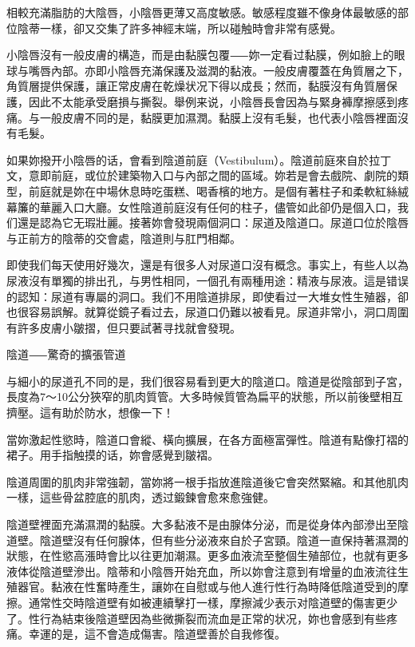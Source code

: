 \documentclass[12pt,UTF8]{ctexbook}
\begin{document}
相較充滿脂肪的大陰唇，小陰唇更薄又高度敏感。敏感程度雖不像身体最敏感的部位陰蒂一樣，卻又交集了許多神經末端，所以碰触時會非常有感覺。

小陰唇沒有一般皮膚的構造，而是由黏膜包覆⸺妳一定看过黏膜，例如臉上的眼球与嘴唇內部。亦即小陰唇充滿保護及滋潤的黏液。一般皮膚覆蓋在角質層之下，角質層提供保護，讓正常皮膚在乾燥状况下得以成長；然而，黏膜沒有角質層保護，因此不太能承受磨損与撕裂。舉例来说，小陰唇長會因為与緊身褲摩擦感到疼痛。与一般皮膚不同的是，黏膜更加濕潤。黏膜上沒有毛髮，也代表小陰唇裡面沒有毛髮。

如果妳撥开小陰唇的话，會看到陰道前庭（Vestibulum）。陰道前庭來自於拉丁文，意即前庭，或位於建築物入口与內部之間的區域。妳若是會去戲院、劇院的類型，前庭就是妳在中場休息時吃蛋糕、喝香檳的地方。是個有著柱子和柔軟紅絲絨幕簾的華麗入口大廳。女性陰道前庭沒有任何的柱子，儘管如此卻仍是個入口，我们還是認為它无瑕壯麗。接著妳會發現兩個洞口：尿道及陰道口。尿道口位於陰唇与正前方的陰蒂的交會處，陰道則与肛門相鄰。

即使我们每天使用好幾次，還是有很多人对尿道口沒有概念。事实上，有些人以為尿液沒有單獨的排出孔，与男性相同，一個孔有兩種用途：精液与尿液。這是错误的認知：尿道有專屬的洞口。我们不用陰道排尿，即使看过一大堆女性生殖器，卻也很容易誤解。就算從鏡子看过去，尿道口仍難以被看見。尿道非常小，洞口周圍有許多皮膚小皺摺，但只要試著寻找就會發現。





陰道⸺驚奇的擴張管道




与細小的尿道孔不同的是，我们很容易看到更大的陰道口。陰道是從陰部到子宮，長度為7〜10公分狹窄的肌肉質管。大多時候質管為扁平的狀態，所以前後壁相互擠壓。這有助於防水，想像一下！

當妳激起性慾時，陰道口會縱、橫向擴展，在各方面極富彈性。陰道有點像打褶的裙子。用手指触摸的话，妳會感覺到皺褶。

陰道周圍的肌肉非常強韌，當妳將一根手指放進陰道後它會突然緊縮。和其他肌肉一樣，這些骨盆腔底的肌肉，透过鍛鍊會愈來愈強健。

陰道壁裡面充滿濕潤的黏膜。大多黏液不是由腺体分泌，而是從身体內部滲出至陰道壁。陰道壁沒有任何腺体，但有些分泌液來自於子宮頸。陰道一直保持著濕潤的狀態，在性慾高漲時會比以往更加潮濕。更多血液流至整個生殖部位，也就有更多液体從陰道壁滲出。陰蒂和小陰唇开始充血，所以妳會注意到有增量的血液流往生殖器官。黏液在性奮時產生，讓妳在自慰或与他人進行性行為時降低陰道受到的摩擦。通常性交時陰道壁有如被連續擊打一樣，摩擦減少表示对陰道壁的傷害更少了。性行為結束後陰道壁因為些微撕裂而流血是正常的状况，妳也會感到有些疼痛。幸運的是，這不會造成傷害。陰道壁善於自我修復。
\end{document}
